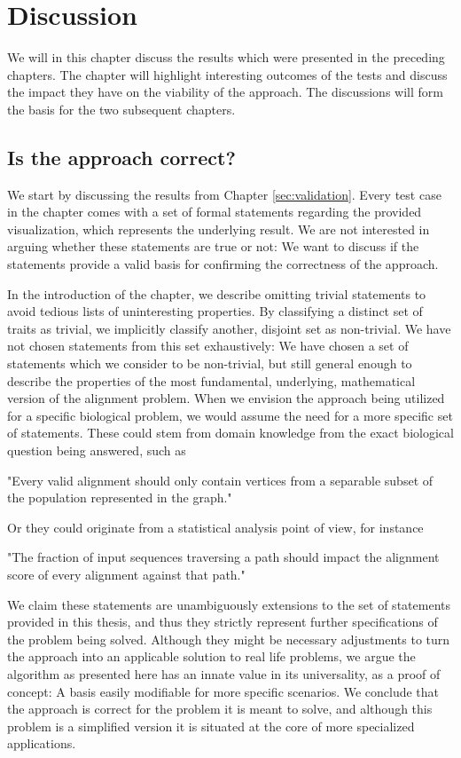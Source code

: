 \documentclass[thesis.tex]{subfiles}
\begin{document}
\chapter{Discussion}
\label{sec:discussion}
We will in this chapter discuss the results which were presented in the preceding chapters. The chapter will highlight interesting outcomes of the tests and discuss the impact they have on the viability of the approach. The discussions will form the basis for the two subsequent chapters.
\section{Is the approach correct?}
We start by discussing the results from Chapter \ref{sec:validation}. Every test case in the chapter comes with a set of formal statements regarding the provided visualization, which represents the underlying result. We are not interested in arguing whether these statements are true or not: We want to discuss if the statements provide a valid basis for confirming the correctness of the approach. \\
\par\noindent
In the introduction of the chapter, we describe omitting trivial statements to avoid tedious lists of uninteresting properties. By classifying a distinct set of traits as trivial, we implicitly classify another, disjoint set as non-trivial. We have not chosen statements from this set exhaustively: We have chosen a set of statements which we consider to be non-trivial, but still general enough to describe the properties of the most fundamental, underlying, mathematical version of the alignment problem. When we envision the approach being utilized for a specific biological problem, we would assume the need for a more specific set of statements. These could stem from domain knowledge from the exact biological question being answered, such as 
\begin{displayquote}
"Every valid alignment should only contain vertices from a separable subset of the population represented in the graph."
\end{displayquote}
Or they could originate from a statistical analysis point of view, for instance
\begin{displayquote}
"The fraction of input sequences traversing a path should impact the alignment score of every alignment against that path."
\end{displayquote}
We claim these statements are unambiguously extensions to the set of statements provided in this thesis, and thus they strictly represent further specifications of the problem being solved. Although they might be necessary adjustments to turn the approach into an applicable solution to real life problems, we argue the algorithm as presented here has an innate value in its universality, as a proof of concept: A basis easily modifiable for more specific scenarios. We conclude that the approach is correct for the problem it is meant to solve, and although this problem is a simplified version it is situated at the core of more specialized applications.\\
\end{document}
